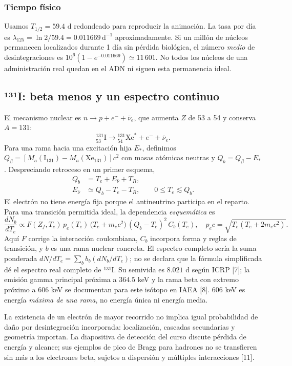 \documentclass[11pt,a4paper,oneside]{article}
\begin{document}
\subsubsection{Tiempo físico}\label{tiempo-fuxedsico}

Usamos \(T_{1/2}=59.4\) d redondeado para reproducir la animación. La tasa por día es \(\lambda_{125}=\ln2/59.4=0.011669\,\mathrm{d}^{-1}\) aproximadamente. Si un millón de núcleos permanecen localizados durante 1 día sin pérdida biológica, el número \emph{medio} de desintegraciones es \(10^6(1-e^{-0.011669})\simeq11\,601\). No todos los núcleos de una administración real quedan en el ADN ni siguen esta permanencia ideal.

\subsection{¹³¹I: beta menos y un espectro continuo}\label{i-beta-menos-y-un-espectro-continuo}

El mecanismo nuclear es \(n\to p+e^-+\bar\nu_e\), que aumenta \(Z\) de 53 a 54 y conserva \(A=131\): \[{}^{131}_{53}\mathrm I\longrightarrow{}^{131}_{54}\mathrm{Xe}^*+e^-+\bar\nu_e .\] Para una rama hacia una excitación hija \(E_*\), definimos \(Q_\beta=[M_a(\mathrm{I}_{131})-M_a(\mathrm{Xe}_{131})]c^2\) con masas atómicas neutras y \(Q_b=Q_\beta-E_*\). Despreciando retroceso en un primer esquema, \[\begin{aligned}
Q_b&=T_e+E_{\bar\nu}+T_R,\\ E_{\bar\nu}&\simeq Q_b-T_e-T_R,\qquad 0\leq T_e\lesssim Q_b.
\end{aligned}\] El electrón no tiene energía fija porque el antineutrino participa en el reparto. Para una transición permitida ideal, la dependencia \emph{esquemática} es \[\frac{dN_b}{dT_e}\propto F(Z_f,T_e)\,p_e(T_e)\,\bigl(T_e+m_ec^2\bigr)\,(Q_b-T_e)^2\,C_b(T_e),\quad p_ec=\sqrt{T_e(T_e+2m_ec^2)}.\] Aquí \(F\) corrige la interacción coulombiana, \(C_b\) incorpora forma y reglas de transición, y \(b\) es una rama nuclear concreta. El espectro completo sería la suma ponderada \(dN/dT_e=\sum_b b_b(dN_b/dT_e)\); no se declara que la fórmula simplificada dé el espectro real completo de ¹³¹I. Su semivida es \(8.021\) d según ICRP {[}7{]}; la emisión gamma principal próxima a \(364.5\) keV y la rama beta con extremo próximo a \(606\) keV se documentan para este isótopo en IAEA {[}8{]}. \(606\) keV es energía \emph{máxima de una rama}, no energía única ni energía media.

La existencia de un electrón de mayor recorrido no implica igual probabilidad de daño por desintegración incorporada: localización, cascadas secundarias y geometría importan. La diapositiva de detección del curso discute pérdida de energía y alcance; sus ejemplos de pico de Bragg para hadrones no se transfieren sin más a los electrones beta, sujetos a dispersión y múltiples interacciones {[}11{]}.
\end{document}

